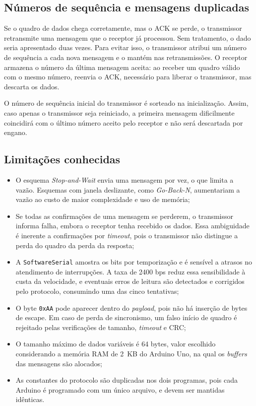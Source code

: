 \documentclass[12pt]{article}
\begin{document}
\subsection{Números de sequência e mensagens duplicadas}

Se o quadro de dados chega corretamente, mas o ACK se perde, o transmissor retransmite uma mensagem que o receptor já processou. Sem tratamento, o dado seria apresentado duas vezes. Para evitar isso, o transmissor atribui um número de sequência a cada nova mensagem e o mantém nas retransmissões. O receptor armazena o número da última mensagem aceita: ao receber um quadro válido com o mesmo número, reenvia o ACK, necessário para liberar o transmissor, mas descarta os dados.

O número de sequência inicial do transmissor é sorteado na inicialização. Assim, caso apenas o transmissor seja reiniciado, a primeira mensagem dificilmente coincidirá com o último número aceito pelo receptor e não será descartada por engano.

\subsection{Limitações conhecidas}

\begin{itemize}
  \item O esquema \emph{Stop-and-Wait} envia uma mensagem por vez, o que limita a vazão. Esquemas com janela deslizante, como \emph{Go-Back-N}, aumentariam a vazão ao custo de maior complexidade e uso de memória;
  \item Se todas as confirmações de uma mensagem se perderem, o transmissor informa falha, embora o receptor tenha recebido os dados. Essa ambiguidade é inerente a confirmações por \emph{timeout}, pois o transmissor não distingue a perda do quadro da perda da resposta;
  \item A \texttt{SoftwareSerial} amostra os bits por temporização e é sensível a atrasos no atendimento de interrupções. A taxa de 2400 bps reduz essa sensibilidade à custa da velocidade, e eventuais erros de leitura são detectados e corrigidos pelo protocolo, consumindo uma das cinco tentativas;
  \item O byte \texttt{0xAA} pode aparecer dentro do \emph{payload}, pois não há inserção de bytes de escape. Em caso de perda de sincronismo, um falso início de quadro é rejeitado pelas verificações de tamanho, \emph{timeout} e CRC;
  \item O tamanho máximo de dados variáveis é 64 bytes, valor escolhido considerando a memória RAM de 2~KB do Arduino Uno, na qual os \emph{buffers} das mensagens são alocados;
  \item As constantes do protocolo são duplicadas nos dois programas, pois cada Arduino é programado com um único arquivo, e devem ser mantidas idênticas.
\end{itemize}
\end{document}
